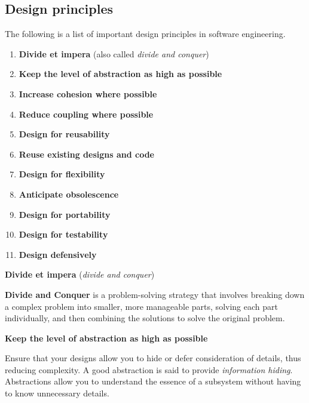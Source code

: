 \subsection{Design principles}

The following is a list of important design principles in software engineering.

\begin{definitionbox}
    \begin{enumerate}
        \item \textbf{Divide et impera} (also called \emph{divide and conquer})
        
        \item \textbf{Keep the level of abstraction as high as possible}

        \item \textbf{Increase cohesion where possible}

        \item \textbf{Reduce coupling where possible}

        \item \textbf{Design for reusability}

        \item \textbf{Reuse existing designs and code}

        \item \textbf{Design for flexibility}

        \item \textbf{Anticipate obsolescence}

        \item \textbf{Design for portability}

        \item \textbf{Design for testability}

        \item \textbf{Design defensively}
    \end{enumerate}
\end{definitionbox}

\begin{flushleft}
    \large
    \textcolor{Red3}{\textbf{Divide et impera} (\emph{divide and conquer})}
\end{flushleft}
\textbf{Divide and Conquer} is a problem-solving strategy that involves breaking down a complex problem into smaller, more manageable parts, solving each part individually, and then combining the solutions to solve the original problem.

\begin{flushleft}
    \large
    \textcolor{Red3}{\textbf{Keep the level of abstraction as high as possible}}
\end{flushleft}
Ensure that your designs allow you to hide or defer consideration of details, thus reducing complexity. A good abstraction is said to provide \emph{information hiding}. Abstractions allow you to understand the essence of a subsystem without having to know unnecessary details.